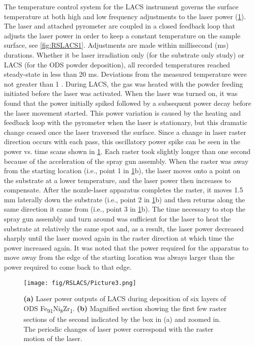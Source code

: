 	
		The temperature control system for the LACS instrument governs the surface temperature at both high and low frequency adjustments to the laser power (\ref{fig:RSLACS3}). The laser and attached pyrometer are coupled in a closed feedback loop that adjusts the laser power in order to keep a constant temperature on the sample surface, see \ref{fig:RSLACS1}. Adjustments are made within millisecond (ms) durations. Whether it be laser irradiation only (for the substrate only study) or LACS (for the ODS powder deposition), all recorded temperatures reached steady-state in less than 20 ms. Deviations from the measured temperature were not greater than 1 \celsius{}. During LACS, the gas was heated with the powder feeding initiated before the laser was activated. When the laser was turned on, it was found that the power initially spiked followed by a subsequent power decay before the laser movement started. This power variation is caused by the heating and feedback loop with the pyrometer when the laser is stationary, but this dramatic change ceased once the laser traversed the surface. Since a change in laser raster direction occurs with each pass, this oscillatory power spike can be seen in the power vs. time scans shown in \ref{fig:RSLACS3}. Each raster took slightly longer than one second because of the acceleration of the spray gun assembly. When the raster was away from the starting location (i.e., point 1 in \ref{fig:RSLACS3}b), the laser moves onto a point on the substrate at a lower temperature, and the laser power then increases to compensate. After the nozzle-laser apparatus completes the raster, it moves 1.5 mm laterally down the substrate (i.e., point 2 in \ref{fig:RSLACS3}b) and then returns along the same direction it came from (i.e., point 3 in \ref{fig:RSLACS3}b). The time necessary to stop the spray gun assembly and turn around was sufficient for the laser to heat the substrate at relatively the same spot and, as a result, the laser power decreased sharply until the laser moved again in the raster direction at which time the power increased again. It was noted that the power required for the apparatus to move away from the edge of the starting location was always larger than the power required to come back to that edge.
	
		
		\begin{figure}
			\centering
			\texttt{[image: fig/RSLACS/Picture3.png]}
			\caption[Laser power outputs of LACS during deposition of ODS Fe\textsubscript{91}Ni\textsubscript{8}Zr\textsubscript{1}.]{\textbf{(a)} Laser power outputs of LACS during deposition of six layers of ODS Fe\textsubscript{91}Ni\textsubscript{8}Zr\textsubscript{1}. \textbf{(b) }Magnified section showing the first few raster sections of the second indicated by the box in (a) and zoomed in.\textbf{ }The periodic changes of laser power correspond with the raster motion of the laser.}
			\label{fig:RSLACS3}
		\end{figure}
		
